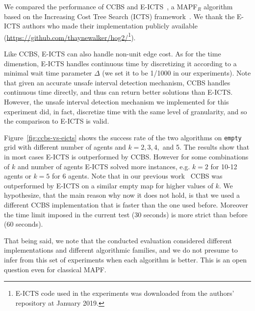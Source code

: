 \documentclass[review]{elsarticle}
\newcommand{\ccbs}{\ac{CCBS}\xspace}
\newcommand{\ct}{\ac{CT}\xspace}
\newcommand{\mapfr}{\ac{MAPF}$_R$\xspace}
\newcommand{\mapf}{\ac{MAPF}\xspace}
\begin{document}
We compared the performance of \ccbs and E-ICTS~\cite{walker2018extended}, a \mapfr algorithm based on the Increasing Cost Tree Search (ICTS) framework~\cite{sharon2013increasing}. We thank the E-ICTS authors who made their implementation publicly available (\url{https://github.com/thaynewalker/hog2/}\footnote{E-ICTS code used in the experiments was downloaded from the authors' repository at January 2019.}).

Like \ccbs, E-ICTS  can also handle non-unit edge cost. As for the time dimenstion, E-ICTS handles continuous time by discretizing it according to a minimal wait time parameter $\Delta$ (we set it to be 1/1000 in our experiments). Note that given an accurate unsafe interval detection mechanism, \ccbs handles continuous time directly, and thus can return better solutions than E-ICTS. However, the unsafe interval detection mechanism we implemented for this experiment did, in fact, discretize time with the same level of granularity, and so the comparison to E-ICTS is valid. 

Figure~\ref{fig:ccbs-vs-eicts} shows the success rate of the two algorithms on \texttt{empty} grid with different number of agents and $k=2, 3, 4,$ and 5. The results show that in most cases E-ICTS is outperformed by \ccbs. However for some combinations of $k$ and number of agents E-ICTS solved more instances, e.g. $k=2$ for 10-12 agents or $k=5$ for 6 agents. Note that in our previous work~\cite{andreychuk2019multi} \ccbs was outperformed by E-ICTS on a similar empty map for higher values of $k$. We hypothesize, that the main reason why now it does not hold, is that we used a different \ccbs implementation that is faster than the one used before. Moreover the time limit imposed in the current test (30 seconds) is more strict than before (60 seconds).



That being said, we note that the conducted evaluation considered different implementations and different algorithmic families, and we do not presume to infer from this set of experiments when each algorithm is better. This is an open question even for classical \mapf.
\end{document}
